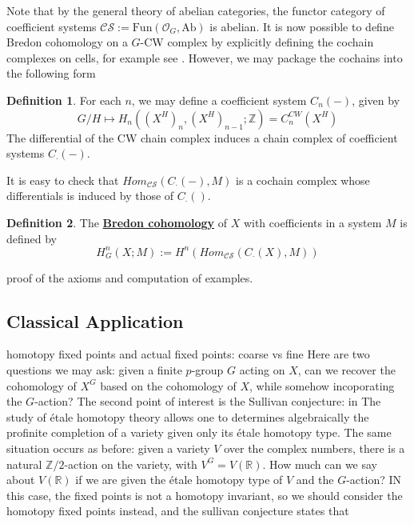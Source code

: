 \documentclass{article}
\theoremstyle{definition}
\theoremstyle{definition}
\newtheorem{definition}{Definition}[theorem]
\theoremstyle{definition}
\theoremstyle{definition}
\theoremstyle{definition}
\theoremstyle{definition}
\theoremstyle{definition}
\begin{document}
Note that by the general theory of abelian categories, the functor category of coefficient systems $\mathcal{CS}:=\textrm{Fun}(\mathcal{O}_G, \textrm{Ab})$ is abelian. It is now possible to define Bredon cohomology on a $G$-CW complex by explicitly defining the cochain complexes on cells, for example see . However, we may package the cochains into the following form 

\begin{tcolorbox}[colback=purple!5!white,colframe=purple!75!black]
\begin{definition}
For each $n$, we may define a coefficient system $C_n(-)$, given by 
\[G/H\mapsto H_n((X^H)_{n},(X^H)_{n-1}; \mathbb{Z})=C_n^{CW}(X^H)\]
The differential of the CW chain complex induces a chain complex of coefficient systems $C_{\cdot}(-)$. 
\end{definition}
\end{tcolorbox}
It is easy to check that $Hom_{\mathcal{CS}}(C_{\cdot}(-),M)$ is a cochain complex whose differentials is induced by those of $C_{\cdot}()$. 
\begin{tcolorbox}[colback=purple!5!white,colframe=purple!75!black]
\begin{definition}
The \underline{\textbf{Bredon cohomology}} of $X$ with coefficients in a system $M$ is defined by 
\[H_G^n(X;M):=H^n(Hom_{\mathcal{CS}}(C_{\cdot}(X),M))\]
\end{definition}
\end{tcolorbox}

proof of the axioms and computation of examples. 

\subsection{Classical Application}
homotopy fixed points and actual fixed points: coarse vs fine
Here are two questions we may ask: given a finite $p$-group $G$ acting on $X$, can we recover the cohomology of $X^G$ based on the cohomology of $X$, while somehow incoporating the $G$-action? The second point of interest is the Sullivan conjecture: in  The study of \'etale homotopy theory allows one to determines algebraically the profinite completion of a variety given only its \'etale homotopy type. The same situation occurs as before: given a variety $V$ over the complex numbers, there is a natural $\mathbb{Z}/2$-action on the variety, with $V^G=V(\mathbb{R})$. How much can we say about $V(\mathbb{R})$ if we are given the \'etale homotopy type of $V$ and the $G$-action? IN this case, the fixed points is not a homotopy invariant, so we should consider the homotopy fixed points instead, and the sullivan conjecture states that 
\end{document}
